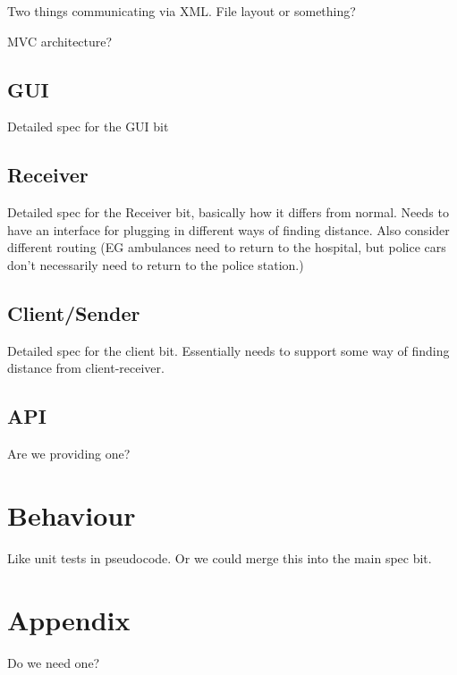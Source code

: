 \documentclass[a4paper]{article}
\begin{document}
Two things communicating via XML. File layout or something? 

MVC architecture? 

\subsection{GUI}%

Detailed spec for the GUI bit

\subsection{Receiver}%

Detailed spec for the Receiver bit, basically how it differs from normal.
Needs to have an interface for plugging in different ways of finding distance.
Also consider different routing (EG ambulances need to return to the hospital,
but police cars don't necessarily need to return to the police station.)

\subsection{Client/Sender}%

Detailed spec for the client bit. Essentially needs to support some way
of finding distance from client-receiver.

\subsection{API}%

Are we providing one?

\section{Behaviour}

Like unit tests in pseudocode. Or we could merge this into the main spec bit.

\section{Appendix}

Do we need one?
\end{document}
